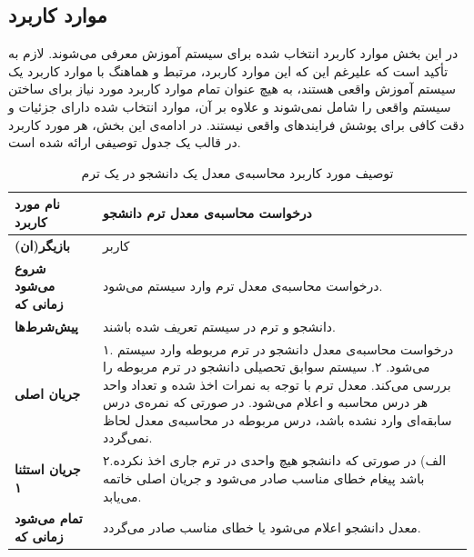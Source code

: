 \subsection{موارد کاربرد}
در این بخش موارد کاربرد انتخاب شده برای سیستم آموزش معرفی می‌شوند. لازم به تأکید است که علیرغم این که این موارد کاربرد، مرتبط و هماهنگ با موارد کاربرد یک سیستم آموزش واقعی هستند، به هیچ عنوان تمام موارد کاربرد مورد نیاز برای ساختن سیستم واقعی را شامل نمی‌شوند و علاوه‌ بر آن، موارد انتخاب شده دارای جزئیات و دقت کافی برای پوشش فرایند‌های واقعی نیستند. در ادامه‌ی این بخش، هر \gls{مورد کاربرد} در قالب یک جدول توصیفی ارائه شده‌ است.


\begin{table}
\begin{center}
\begin{tabular}{|p{5cm}|p{10cm}|}
	\hline
	\textbf{نام مورد کاربرد} &
درخواست محاسبه‌ی معدل ترم دانشجو\\
	\hline
	\textbf{بازیگر(ان)} &
کاربر\\
	\hline
	\textbf{شروع می‌شود زمانی که} &
درخواست محاسبه‌ی معدل ترم وارد سیستم می‌شود.\\
	\hline
	\textbf{پیش‌شرط‌ها} &
دانشجو و ترم در سیستم تعریف شده باشند.\\
	\hline
	\textbf{جریان اصلی} &
۱. درخواست محاسبه‌ی معدل دانشجو در ترم مربوطه وارد سیستم می‌شود.\newline
۲. سیستم سوابق تحصیلی دانشجو در ترم مربوطه را بررسی ‌می‌کند. معدل ترم با توجه به نمرات اخذ شده و تعداد واحد هر درس محاسبه و اعلام می‌شود. در صورتی که نمره‌ی درس سابقه‌ای وارد نشده باشد، درس مربوطه در محاسبه‌ی معدل لحاظ نمی‌گردد.\\
	\hline
\textbf{جریان استثنا ۱} &
۲.الف) در صورتی که دانشجو هیچ واحدی در ترم جاری اخذ نکرده باشد پیغام خطای مناسب صادر می‌شود و جریان اصلی خاتمه می‌یابد.\\
	\hline
	\textbf{تمام می‌شود زمانی که} &
معدل دانشجو اعلام می‌شود یا خطای مناسب صادر می‌گردد.\\
	\hline
\end{tabular}
\caption{\label{table:uc_gpa} توصیف مورد کاربرد محاسبه‌ی معدل یک دانشجو در یک ترم}
\end{center}
\end{table}

